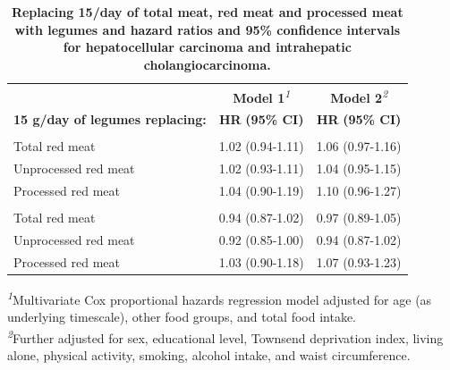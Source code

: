 \documentclass[nutrients,article,submit,moreauthors,pdftex]{Definitions/mdpi}
\begin{document}
\begin{table}[t]
\caption{
\label{tab:cancer}\textbf{Replacing 15/day of total meat, red meat and processed meat with legumes and hazard ratios and 95\% confidence intervals for hepatocellular carcinoma and intrahepatic cholangiocarcinoma.}}
\fontsize{9.0pt}{10.8pt}\selectfont
\begin{tabular*}{1\linewidth}{@{\extracolsep{\fill}}lcc}
\toprule
 & \textbf{Model 1}\textsuperscript{\textit{1}} & \textbf{Model 2}\textsuperscript{\textit{2}} \\
\cmidrule(lr){2-2} \cmidrule(lr){3-3}
\textbf{15 g/day of legumes replacing:} & \textbf{HR} \textbf{(95\% CI)} & \textbf{HR} \textbf{(95\% CI)} \\
\midrule\addlinespace[2.5pt]
\multicolumn{3}{l}{{\bfseries Hepatocellular carcinoma}} \\
\midrule\addlinespace[2.5pt]
Total red meat & 1.02 (0.94-1.11) & 1.06 (0.97-1.16) \\
Unprocessed red meat & 1.02 (0.93-1.11) & 1.04 (0.95-1.15) \\
Processed red meat & 1.04 (0.90-1.19) & 1.10 (0.96-1.27) \\
\midrule\addlinespace[2.5pt]
\multicolumn{3}{l}{{\bfseries Intrahepatic cholangiocarcinoma}} \\
\midrule\addlinespace[2.5pt]
Total red meat & 0.94 (0.87-1.02) & 0.97 (0.89-1.05) \\
Unprocessed red meat & 0.92 (0.85-1.00) & 0.94 (0.87-1.02) \\
Processed red meat & 1.03 (0.90-1.18) & 1.07 (0.93-1.23) \\
\bottomrule
\end{tabular*}
\begin{minipage}{\linewidth}
\textsuperscript{\textit{1}}Multivariate Cox proportional hazards regression model adjusted for age (as underlying timescale), other food groups, and total food intake.\\
\textsuperscript{\textit{2}}Further adjusted for sex, educational level, Townsend deprivation index, living alone, physical activity, smoking, alcohol intake, and waist circumference.\\
\end{minipage}
\end{table}
\end{document}
